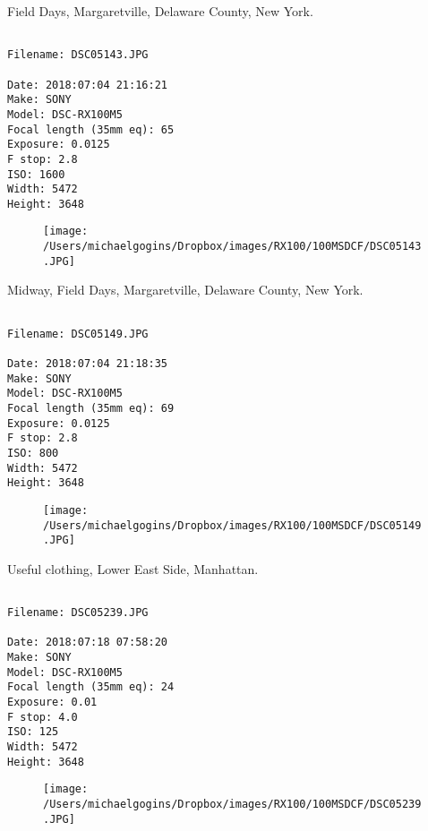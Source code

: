 \clearpage
\onecolumn
\noindent Field Days, Margaretville, Delaware County, New York.
\noindent
\begin{lstlisting}

Filename: DSC05143.JPG

Date: 2018:07:04 21:16:21
Make: SONY
Model: DSC-RX100M5
Focal length (35mm eq): 65
Exposure: 0.0125
F stop: 2.8
ISO: 1600
Width: 5472
Height: 3648
\end{lstlisting}
\clearpage

\begin{figure}
\texttt{[image: /Users/michaelgogins/Dropbox/images/RX100/100MSDCF/DSC05143.JPG]}
\end{figure}
    
\clearpage
\onecolumn
\noindent Midway, Field Days, Margaretville, Delaware County, New York.
\noindent
\begin{lstlisting}

Filename: DSC05149.JPG

Date: 2018:07:04 21:18:35
Make: SONY
Model: DSC-RX100M5
Focal length (35mm eq): 69
Exposure: 0.0125
F stop: 2.8
ISO: 800
Width: 5472
Height: 3648
\end{lstlisting}
\clearpage

\begin{figure}
\texttt{[image: /Users/michaelgogins/Dropbox/images/RX100/100MSDCF/DSC05149.JPG]}
\end{figure}
    
\clearpage
\onecolumn
\noindent Useful clothing, Lower East Side, Manhattan.
\noindent
\begin{lstlisting}

Filename: DSC05239.JPG

Date: 2018:07:18 07:58:20
Make: SONY
Model: DSC-RX100M5
Focal length (35mm eq): 24
Exposure: 0.01
F stop: 4.0
ISO: 125
Width: 5472
Height: 3648
\end{lstlisting}
\clearpage

\begin{figure}
\texttt{[image: /Users/michaelgogins/Dropbox/images/RX100/100MSDCF/DSC05239.JPG]}
\end{figure}
    
